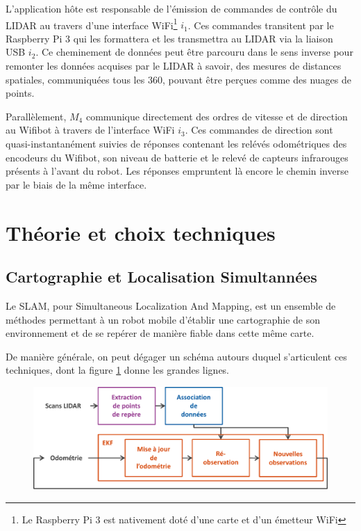 L'application hôte est responsable de l'émission de commandes de contrôle du LIDAR au travers d'une interface WiFi\footnote{Le Raspberry Pi 3 est nativement doté d'une carte et d'un émetteur WiFi} $i_{1}$. 
Ces commandes transitent par le Raspberry Pi 3 qui les formattera et les transmettra au LIDAR via la liaison USB $i_{2}$. 
Ce cheminement de données peut être parcouru dans le sens inverse pour remonter les données acquises par le LIDAR à savoir, 
des mesures de distances spatiales, communiquées tous les 360\degre, pouvant être perçues comme des nuages de points. 

Parallèlement, $M_{4}$ communique directement des ordres de vitesse et de direction au Wifibot à travers de l'interface WiFi $i_{3}$. 
Ces commandes de direction sont quasi-instantanément suivies de réponses contenant les relévés odométriques des encodeurs du Wifibot, son niveau de batterie et le relevé de capteurs infrarouges présents 
à l'avant du robot. Les réponses empruntent là encore le chemin inverse par le biais de la même interface. 

\section{Théorie et choix techniques}

  \subsection{Cartographie et Localisation Simultannées}
  
Le SLAM, pour Simultaneous Localization And Mapping, est un ensemble de méthodes permettant à un robot mobile d'établir une cartographie de son environnement et de se repérer de manière fiable dans cette même carte. 
 
De manière générale, on peut dégager un schéma autours duquel s'articulent ces techniques, dont la figure \ref{fig:slam-proc} donne les grandes lignes.

\begin{figure}[h]
  \centering
    \includegraphics[width=.8\linewidth]{figures/slam-proc-h}  
  \label{fig:slam-proc}
\end{figure}

